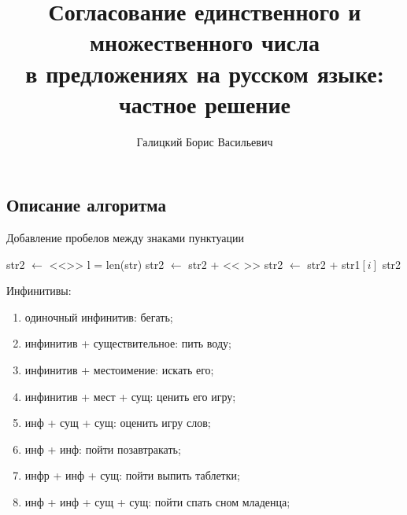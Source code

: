 \documentclass[a4paper,12pt]{article} %
\title{Согласование единственного и множественного числа\\ в предложениях на русском языке: частное решение}
\author{Галицкий Борис Васильевич}
\theoremstyle{definition}
\theoremstyle{plain}
\begin{document}
\maketitle

\subsection*{Описание алгоритма}



\begin{algorithm}
\caption{Добавление пробелов между знаками пунктуации}
\begin{algorithmic}[1]
\State str2 $\gets $ <<>> 
\State l = len(str)
\State str2 $\gets$ str2 + << >>
\EndIf
\State str2 $\gets$ str2 + str1$[i]$
\EndFor
\State\Return str2
\EndFunction
\end{algorithmic}
\end{algorithm}
Инфинитивы:
\begin{enumerate}
	\item одиночный инфинитив: бегать;
	\item инфинитив + существительное: пить воду;
	\item инфинитив + местоимение: искать его;
	\item инфинитив + мест + сущ: ценить его игру;
	\item инф + сущ + сущ: оценить игру слов;
	\item инф + инф: пойти позавтракать;
	\item инфр + инф + сущ: пойти выпить таблетки;
	\item инф + инф + сущ + сущ: пойти спать сном младенца;
\end{enumerate}
\end{document}
